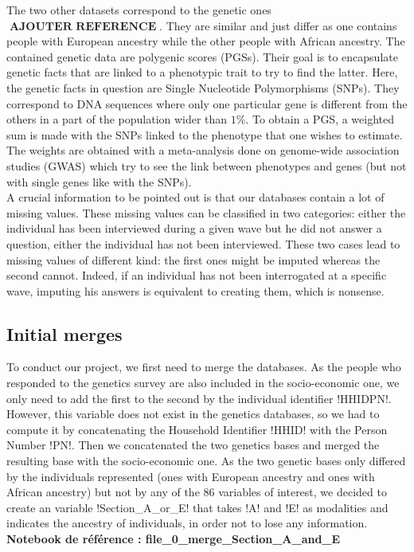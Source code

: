 \documentclass[]{article}
\DeclareMathOperator*{\addref}{\textbf{AJOUTER REFERENCE}}
\begin{document}
\noindent
The two other datasets correspond to the genetic ones $\addref$. They are similar and just differ as one contains people with European ancestry while the other people with African ancestry. The contained genetic data are polygenic scores (PGSs). Their goal is to encapsulate genetic facts that are linked to a phenotypic trait to try to find the latter. Here, the genetic facts in question are Single Nucleotide Polymorphisms (SNPs). They correspond to DNA sequences where only one particular gene is different from the others in a part of the population wider than $1$\%. To obtain a PGS, a weighted sum is made with the SNPs linked to the phenotype that one wishes to estimate. The weights are obtained with a meta-analysis done on genome-wide association studies (GWAS) which try to see the link between phenotypes and genes (but not with single genes like with the SNPs).\\

\noindent
A crucial information to be pointed out is that our databases contain a lot of missing values. These missing values can be classified in two categories: either the individual has been interviewed during a given wave but he did not answer a question, either the individual has not been interviewed. These two cases lead to missing values of different kind: the first ones might be imputed whereas the second cannot. Indeed, if an individual has not been interrogated at a specific wave, imputing his answers is equivalent to creating them, which is nonsense.

\subsection{Initial merges}
To conduct our project, we first need to merge the databases. As the people who responded to the genetics survey are also included in the socio-economic one, we only need to add the first to the second by the individual identifier \pyth!HHIDPN!. However, this variable does not exist in the genetics databases, so we had to compute it by concatenating the Household Identifier \pyth!HHID! with the Person Number \pyth!PN!. Then we concatenated the two genetics bases and merged the resulting base with the socio-economic one. As the two genetic bases only differed by the individuals represented (ones with European ancestry and ones with African ancestry) but not by any of the $86$ variables of interest, we decided to create an  variable \pyth!Section_A_or_E! that takes \pyth!A! and \pyth!E! as modalities and indicates the ancestry of individuals, in order not to lose any information.\\
\textbf{Notebook de référence : file\_0\_merge\_Section\_A\_and\_E}
\end{document}

